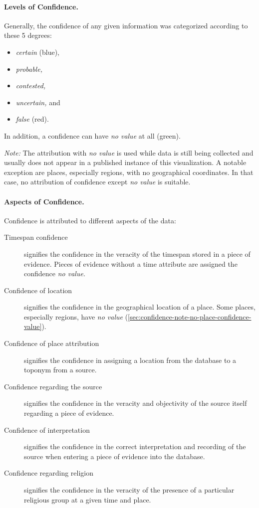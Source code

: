 \paragraph{Levels of Confidence.}
Generally, the confidence of any given information was categorized according to these 5 degrees:

\begin{itemize}
  \item \emph{certain} (blue),
  \item \emph{probable,}
  \item \emph{contested,}
  \item \emph{uncertain,} and
  \item \emph{false} (red).
\end{itemize}

In addition, a confidence can have \emph{no value} at all (green).

\label{sec:confidence-note-no-place-confidence-value}
\emph{Note:} The attribution with \emph{no value} is used while data is still being collected and usually does not appear in a published instance of this visualization.
A notable exception are places, especially regions, with no geographical coordinates.
In that case, no attribution of confidence except \emph{no value} is suitable.

\paragraph{Aspects of Confidence.}
Confidence is attributed to different aspects of the data:

\begin{description}
  \item[Timespan confidence]
    signifies the confidence in the veracity of the timespan stored in a piece of evidence.
    Pieces of evidence without a time attribute are assigned the confidence \emph{no value.}
  \item[Confidence of location]
    signifies the confidence in the geographical location of a place.
    Some places, especially regions, have \emph{no value} (\cref{sec:confidence-note-no-place-confidence-value}).
  \item[Confidence of place attribution]
    signifies the confidence in assigning a location from the database to a toponym from a source.
  \item[Confidence regarding the source]
    signifies the confidence in the veracity and objectivity of the source itself regarding a piece of evidence.
  \item[Confidence of interpretation]
    signifies the confidence in the correct interpretation and recording of the source when entering a piece of evidence into the database.
  \item[Confidence regarding religion]
    signifies the confidence in the veracity of the presence of a particular religious group at a given time and place.
\end{description}


